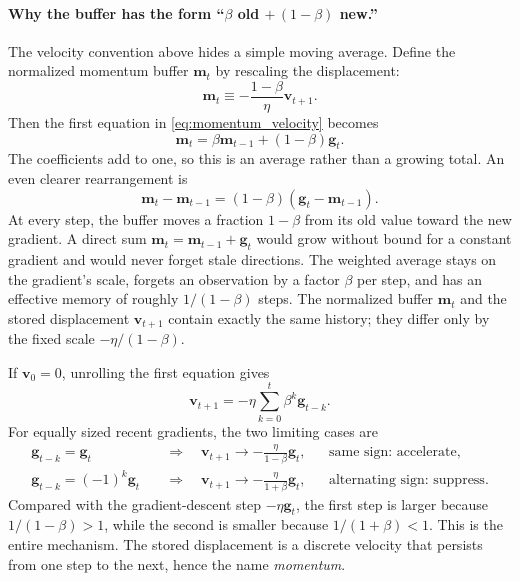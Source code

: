 \documentclass[11pt,letterpaper]{article}
\begin{document}
\paragraph{Why the buffer has the form ``\(\beta\) old
\(+\,(1-\beta)\) new.''}
The velocity convention above hides a simple moving average. Define the
normalized momentum buffer \(\bm m_t\) by rescaling the displacement:
\begin{equation}
  \bm m_t\equiv-\frac{1-\beta}{\eta}\bm v_{t+1}.
\end{equation}
Then the first equation in \eqref{eq:momentum_velocity} becomes
\begin{equation}\label{eq:momentum_ema}
  \bm m_t
  =\beta\bm m_{t-1}+(1-\beta)\bm g_t.
\end{equation}
The coefficients add to one, so this is an average rather than a growing
total. An even clearer rearrangement is
\begin{equation}
  \bm m_t-\bm m_{t-1}
  =(1-\beta)(\bm g_t-\bm m_{t-1}).
\end{equation}
At every step, the buffer moves a fraction \(1-\beta\) from its old value
toward the new gradient. A direct sum \(\bm m_t=\bm m_{t-1}+\bm g_t\) would
grow without bound for a constant gradient and would never forget stale
directions. The weighted average stays on the gradient's scale, forgets an
observation by a factor \(\beta\) per step, and has an effective memory of
roughly \(1/(1-\beta)\) steps. The normalized buffer \(\bm m_t\) and the
stored displacement \(\bm v_{t+1}\) contain exactly the same history; they
differ only by the fixed scale \(-\eta/(1-\beta)\).

If \(\bm v_0=0\), unrolling the first equation gives
\begin{equation}
  \bm v_{t+1}
  =-\eta\sum_{k=0}^{t}\beta^k\bm g_{t-k}.
\end{equation}
For equally sized recent gradients, the two limiting cases are
\begin{equation}
  \begin{aligned}
    \bm g_{t-k}=\bm g_t
    &\quad\Longrightarrow\quad
    \bm v_{t+1}\longrightarrow
      -\frac{\eta}{1-\beta}\bm g_t,
    &&\text{same sign: accelerate},\\
    \bm g_{t-k}=(-1)^k\bm g_t
    &\quad\Longrightarrow\quad
    \bm v_{t+1}\longrightarrow
      -\frac{\eta}{1+\beta}\bm g_t,
    &&\text{alternating sign: suppress}.
  \end{aligned}
\end{equation}
Compared with the gradient-descent step \(-\eta\bm g_t\), the first step is
larger because \(1/(1-\beta)>1\), while the second is smaller because
\(1/(1+\beta)<1\). This is the entire mechanism. The stored displacement is a
discrete velocity that persists from one step to the next, hence the name
\emph{momentum}.
\end{document}
